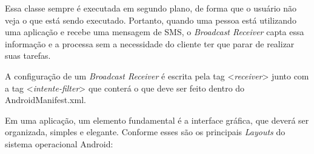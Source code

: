 	\par Essa classe sempre é executada em segundo plano, de forma que o usuário
não veja o que está sendo executado. Portanto, quando uma pessoa está
utilizando uma aplicação e recebe uma mensagem de SMS, o \textit{Broadcast
Receiver} capta essa informação e a processa sem a necessidade do cliente ter
que parar de realizar suas tarefas.

	\par A configuração de um \textit{Broadcast Receiver} é escrita pela tag
<\textit{receiver}> junto com a tag <\textit{intente-filter}> que conterá o que
deve ser feito dentro do AndroidManifest.xml.

	\par Em uma aplicação, um elemento fundamental é a interface gráfica, que
deverá ser organizada, simples e elegante. Conforme 
esses são os principais \textit{Layouts} do sistema operacional Android:
